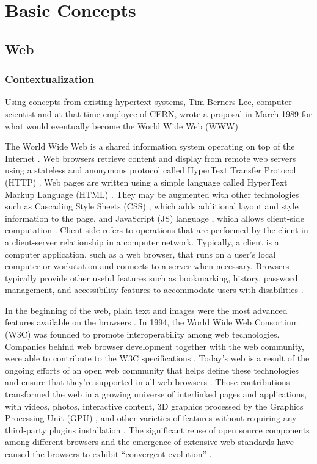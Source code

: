 \chapter{Basic Concepts} %
\label{cha:basic_concepts}

\section{Web} %
\label{sec:basic_concepts:web}

\subsection{Contextualization} %
\label{sub:basic_concepts:web:web:contextualization}

Using concepts from existing hypertext systems, Tim Berners-Lee, computer scientist and at that time employee of CERN, wrote a proposal in March 1989 for what would eventually become the World Wide Web (WWW) \cite{WC2006}.

The World Wide Web is a shared information system operating on top of the Internet \cite{WC2006}. Web browsers retrieve content and display from remote web servers using a stateless and anonymous protocol called HyperText Transfer Protocol (HTTP) \cite{WC2006}. Web pages are written using a simple language called HyperText Markup Language (HTML) \cite{WC2006}. They may be augmented with other technologies such as Cascading Style Sheets (CSS) \cite{CSS2013}, which adds additional layout and style information to the page, and JavaScript (JS) language \cite{International2009}, which allows client-side computation \cite{WC2006}. Client-side refers to operations that are performed by the client in a client-server relationship in a computer network. Typically, a client is a computer application, such as a web browser, that runs on a user's local computer or workstation and connects to a server when necessary. Browsers typically provide other useful features such as bookmarking, history, password management, and accessibility features to accommodate users with disabilities \cite{Grosskurth2005}.

In the beginning of the web, plain text and images were the most advanced features available on the browsers \cite{WC2006}. In 1994, the World Wide Web Consortium (W3C) was founded to promote interoperability among web technologies. Companies behind web browser development together with the web community, were able to contribute to the W3C specifications \cite{WC2006}. Today's web is a result of the ongoing efforts of an open web community that helps define these technologies and ensure that they're supported in all web browsers \cite{Grosskurth2005}. Those contributions transformed the web in a growing universe of interlinked pages and applications, with videos, photos, interactive content, 3D graphics processed by the Graphics Processing Unit (GPU) \cite{WebGL2013}, and other varieties of features without requiring any third-party plugins installation \cite{Hickson2013}. The significant reuse of open source components among different browsers and the emergence of extensive web standards have caused the browsers to exhibit ``convergent evolution'' \cite{Grosskurth2005}.

